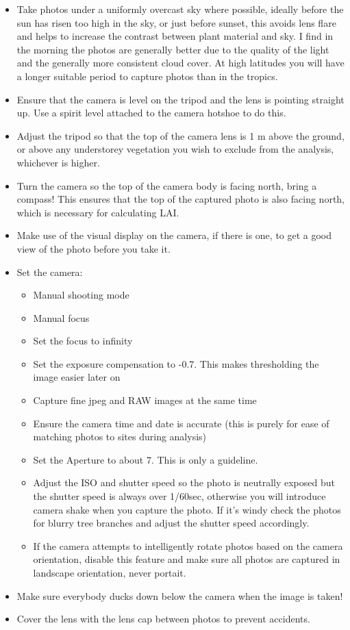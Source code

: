 \documentclass{article}
\begin{document}
\begin{itemize}
	\item{Take photos under a uniformly overcast sky where possible, ideally before the sun has risen too high in the sky, or just before sunset, this avoids lens flare and helps to increase the contrast between plant material and sky. I find in the morning the photos are generally better due to the quality of the light and the generally more consistent cloud cover. At high latitudes you will have a longer suitable period to capture photos than in the tropics.}
	\item{Ensure that the camera is level on the tripod and the lens is pointing straight up. Use a spirit level attached to the camera hotshoe to do this.}
	\item{Adjust the tripod so that the top of the camera lens is 1 m above the ground, or above any understorey vegetation you wish to exclude from the analysis, whichever is higher.} 
	\item{Turn the camera so the top of the camera body is facing north, bring a compass! This ensures that the top of the captured photo is also facing north, which is necessary for calculating LAI.}
	\item{Make use of the visual display on the camera, if there is one, to get a good view of the photo before you take it.}
	\item{Set the camera:}
		\begin{itemize}
			\item{Manual shooting mode}
			\item{Manual focus}
			\item{Set the focus to infinity}
			\item{Set the exposure compensation to -0.7. This makes thresholding the image easier later on}
			\item{Capture fine jpeg and RAW images at the same time}
			\item{Ensure the camera time and date is accurate (this is purely for ease of matching photos to sites during analysis)}
			\item{Set the Aperture to about 7. This is only a guideline.}
			\item{Adjust the ISO and shutter speed so the photo is neutrally exposed but the shutter speed is always over 1/60sec, otherwise you will introduce camera shake when you capture the photo. If it's windy check the photos for blurry tree branches and adjust the shutter speed accordingly.}
			\item{If the camera attempts to intelligently rotate photos based on the camera orientation, disable this feature and make sure all photos are captured in landscape orientation, never portait.}
		\end{itemize}
	\item{Make sure everybody ducks down below the camera when the image is taken!}
	\item{Cover the lens with the lens cap between photos to prevent accidents.}
\end{itemize}
\end{document}
